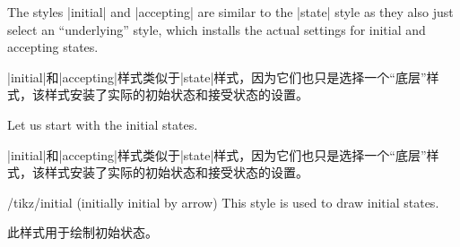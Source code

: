 The styles |initial| and |accepting| are similar to the |state| style as they
also just select an ``underlying'' style, which installs the actual settings
for initial and accepting states.

|initial|和|accepting|样式类似于|state|样式，因为它们也只是选择一个“底层”样式，该样式安装了实际的初始状态和接受状态的设置。

Let us start with the initial states.

|initial|和|accepting|样式类似于|state|样式，因为它们也只是选择一个“底层”样式，该样式安装了实际的初始状态和接受状态的设置。

%
\begin{stylekey}{/tikz/initial (initially initial by arrow)}
    This style is used to draw initial states.

    此样式用于绘制初始状态。


\end{stylekey}

